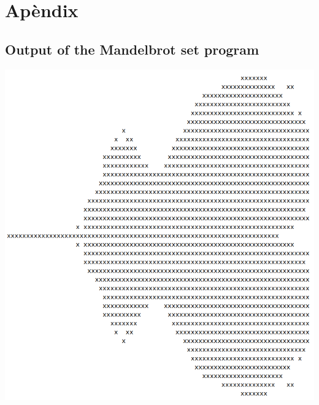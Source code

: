﻿\documentclass[10pt,a4paper,twocolumn,twoside]{article}
\begin{document}
\appendix

\section*{Apèndix}

\setcounter{section}{1}

\subsection{Output of the Mandelbrot set program}
\includegraphics[width=\linewidth]{mandelbrot}
\end{document}

